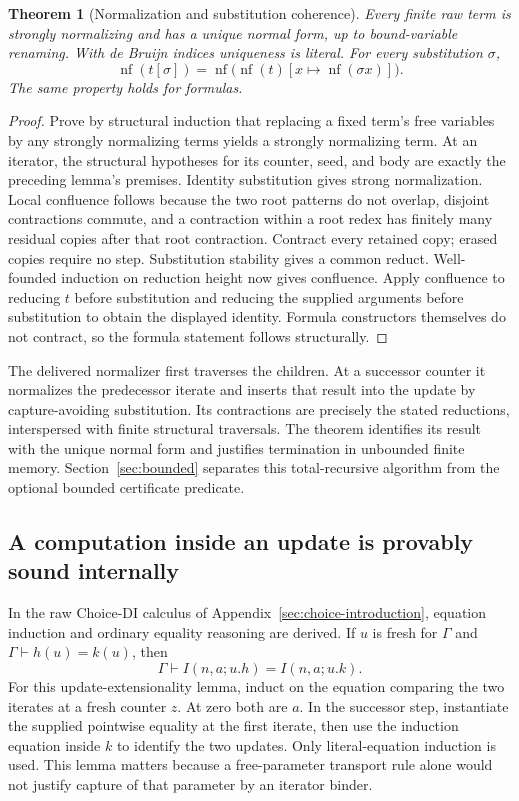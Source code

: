 \documentclass[11pt,letterpaper]{article}
\newtheorem{theorem}{Theorem}[section]
\theoremstyle{definition}\newtheorem{definition}[theorem]{Definition}
\theoremstyle{remark}\newtheorem{remark}[theorem]{Remark}
\newcommand{\nf}{\operatorname{nf}}
\begin{document}
\begin{theorem}[Normalization and substitution coherence]
Every finite raw term is strongly normalizing and has a unique normal form,
up to bound-variable renaming. With de Bruijn indices uniqueness is literal.
For every substitution $\sigma$,
\[
 \nf(t[\sigma])=
 \nf\bigl(\nf(t)[x\mapsto\nf(\sigma x)]\bigr).
\]
The same property holds for formulas.
\end{theorem}
\begin{proof}
Prove by structural induction that replacing a fixed term's free variables
by any strongly normalizing terms yields a strongly normalizing term. At an
iterator, the structural hypotheses for its counter, seed, and body are
exactly the preceding lemma's premises. Identity substitution gives strong
normalization. Local confluence follows because the two root patterns do
not overlap, disjoint contractions commute, and a contraction within a root
redex has finitely many residual copies after that root contraction. Contract
every retained copy; erased copies require no step. Substitution stability
gives a common reduct. Well-founded induction on reduction height now gives
confluence. Apply confluence to reducing $t$ before substitution and reducing
the supplied arguments before substitution to obtain the displayed identity.
Formula constructors themselves do not contract, so the formula statement
follows structurally.
\end{proof}

The delivered normalizer first traverses the children. At a successor
counter it normalizes the predecessor iterate and inserts that result into
the update by capture-avoiding substitution. Its contractions are precisely
the stated reductions, interspersed with finite structural traversals.
The theorem identifies its result with the unique normal form and justifies
termination in unbounded finite memory. Section~\ref{sec:bounded} separates
this total-recursive algorithm from the optional bounded certificate predicate.

\subsection{A computation inside an update is provably sound internally}

In the raw Choice-DI calculus of Appendix~\ref{sec:choice-introduction},
equation induction and ordinary equality reasoning are derived. If $u$ is
fresh for $\Gamma$ and $\Gamma\vdash h(u)=k(u)$, then
\[
 \Gamma\vdash I(n,a;u.h)=I(n,a;u.k).
\]
For this update-extensionality lemma, induct on the equation comparing the
two iterates at a fresh counter $z$. At zero both are $a$. In the successor
step, instantiate the supplied pointwise equality at the first iterate,
then use the induction equation inside $k$ to identify the two updates.
Only literal-equation induction is used. This lemma matters because a
free-parameter transport rule alone would not justify capture of that
parameter by an iterator binder.
\end{document}
